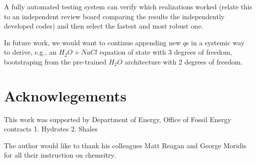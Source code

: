 \documentclass[AMA,STIX1COL]{WileyNJD-v2}
\begin{document}
A fully automated testing system can verify which realizations worked
(relate this to an independent review board comparing the results the
independently developed codes) and then select the fastest and most
robust one.


In future work, we would want to continue appending new \(q\)s in a
systemic way to derive, e.g., an \(H_2O + NaCl\) equation of state with
3 degrees of freedom, bootstraping from the pre-trained \(H_2O\)
architecture with 2 degrees of freedom.

\section*{Acknowlegements}

This work was supported by Department of Energy, Office of Fossil
Energy contracts
1. Hydrates
2. Shales

The author would like to thank his colleagues Matt Reagan and George
Moridis for all their instruction on chemsitry. 


\end{document}
